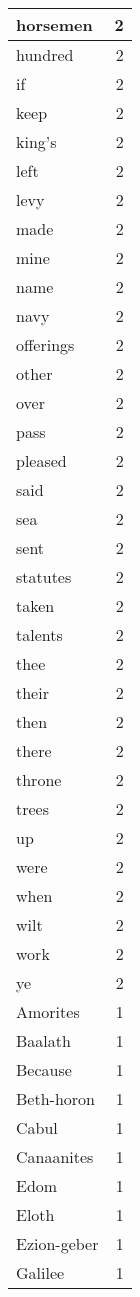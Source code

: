 \begin{center}
\begin{longtable}{l|r}
horsemen & 2 \\ \hline
hundred & 2 \\ \hline
if & 2 \\ \hline
keep & 2 \\ \hline
king's & 2 \\ \hline
left & 2 \\ \hline
levy & 2 \\ \hline
made & 2 \\ \hline
mine & 2 \\ \hline
name & 2 \\ \hline
navy & 2 \\ \hline
offerings & 2 \\ \hline
other & 2 \\ \hline
over & 2 \\ \hline
pass & 2 \\ \hline
pleased & 2 \\ \hline
said & 2 \\ \hline
sea & 2 \\ \hline
sent & 2 \\ \hline
statutes & 2 \\ \hline
taken & 2 \\ \hline
talents & 2 \\ \hline
thee & 2 \\ \hline
their & 2 \\ \hline
then & 2 \\ \hline
there & 2 \\ \hline
throne & 2 \\ \hline
trees & 2 \\ \hline
up & 2 \\ \hline
were & 2 \\ \hline
when & 2 \\ \hline
wilt & 2 \\ \hline
work & 2 \\ \hline
ye & 2 \\ \hline
Amorites & 1 \\ \hline
Baalath & 1 \\ \hline
Because & 1 \\ \hline
Beth-horon & 1 \\ \hline
Cabul & 1 \\ \hline
Canaanites & 1 \\ \hline
Edom & 1 \\ \hline
Eloth & 1 \\ \hline
Ezion-geber & 1 \\ \hline
Galilee & 1 \\ \hline

\end{longtable}
\end{center}
